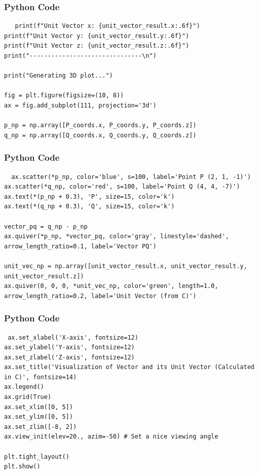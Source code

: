 \documentclass{beamer}
\begin{document}
\begin{frame}[fragile]
    \frametitle{Python Code}
    \begin{lstlisting}
   print(f"Unit Vector x: {unit_vector_result.x:.6f}")
print(f"Unit Vector y: {unit_vector_result.y:.6f}")
print(f"Unit Vector z: {unit_vector_result.z:.6f}")
print("-------------------------------\n")

print("Generating 3D plot...")

fig = plt.figure(figsize=(10, 8))
ax = fig.add_subplot(111, projection='3d')

p_np = np.array([P_coords.x, P_coords.y, P_coords.z])
q_np = np.array([Q_coords.x, Q_coords.y, Q_coords.z])

    \end{lstlisting}
\end{frame}
\begin{frame}[fragile]
    \frametitle{Python Code}
    \begin{lstlisting}
  ax.scatter(*p_np, color='blue', s=100, label='Point P (2, 1, -1)')
ax.scatter(*q_np, color='red', s=100, label='Point Q (4, 4, -7)')
ax.text(*(p_np + 0.3), 'P', size=15, color='k')
ax.text(*(q_np + 0.3), 'Q', size=15, color='k')

vector_pq = q_np - p_np
ax.quiver(*p_np, *vector_pq, color='gray', linestyle='dashed', arrow_length_ratio=0.1, label='Vector PQ')

unit_vec_np = np.array([unit_vector_result.x, unit_vector_result.y, unit_vector_result.z])
ax.quiver(0, 0, 0, *unit_vec_np, color='green', length=1.0, arrow_length_ratio=0.2, label='Unit Vector (from C)')
    \end{lstlisting}
\end{frame}
\begin{frame}[fragile]
    \frametitle{Python Code}
    \begin{lstlisting}
 ax.set_xlabel('X-axis', fontsize=12)
ax.set_ylabel('Y-axis', fontsize=12)
ax.set_zlabel('Z-axis', fontsize=12)
ax.set_title('Visualization of Vector and its Unit Vector (Calculated in C)', fontsize=14)
ax.legend()
ax.grid(True)
ax.set_xlim([0, 5])
ax.set_ylim([0, 5])
ax.set_zlim([-8, 2])
ax.view_init(elev=20., azim=-50) # Set a nice viewing angle

plt.tight_layout()
plt.show()

    \end{lstlisting}
\end{frame}
\end{document}
